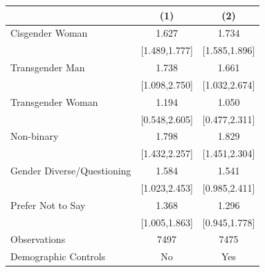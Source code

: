 \begin{tabular}{lcc}
\toprule
                    &\multicolumn{1}{c}{(1)}         &\multicolumn{1}{c}{(2)}         \\
\midrule
 Cisgender Woman&                 1.627\sym{***}&                 1.734\sym{***}\\
                    &         [1.489,1.777]         &         [1.585,1.896]         \\
\addlinespace
 Transgender Man&                 1.738\sym{**} &                 1.661\sym{**} \\
                    &         [1.098,2.750]         &         [1.032,2.674]         \\
\addlinespace
 Transgender Woman&                 1.194         &                 1.050         \\
                    &         [0.548,2.605]         &         [0.477,2.311]         \\
\addlinespace
 Non-binary&                 1.798\sym{***}&                 1.829\sym{***}\\
                    &         [1.432,2.257]         &         [1.451,2.304]         \\
\addlinespace
 Gender Diverse/Questioning&                 1.584\sym{**} &                 1.541\sym{*}  \\
                    &         [1.023,2.453]         &         [0.985,2.411]         \\
\addlinespace
 Prefer Not to Say&                 1.368\sym{**} &                 1.296         \\
                    &         [1.005,1.863]         &         [0.945,1.778]         \\
\midrule
Observations        &                  7497         &                  7475         \\
Demographic Controls&                    No         &                   Yes         \\
\bottomrule
\end{tabular}
